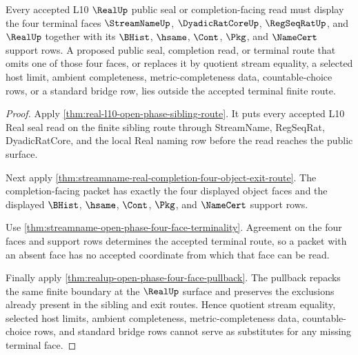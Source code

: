 \begin{theorem}
\label{thm:real-terminal-four-object-refusal}
Every accepted L10 $\RealUp$ public seal or completion-facing read must display the four terminal faces $\StreamNameUp$, $\DyadicRatCoreUp$, $\RegSeqRatUp$, and $\RealUp$ together with its $\BHist$, $\hsame$, $\Cont$, $\Pkg$, and $\NameCert$ support rows. A proposed public seal, completion read, or terminal route that omits one of those four faces, or replaces it by quotient stream equality, a selected host limit, ambient completeness, metric-completeness data, countable-choice rows, or a standard bridge row, lies outside the accepted terminal finite route.
\end{theorem}
\begin{proof}
Apply \autoref{thm:real-l10-open-phase-sibling-route}. It puts every accepted L10 Real seal read on the finite sibling route through StreamName, RegSeqRat, DyadicRatCore, and the local Real naming row before the read reaches the public surface.

Next apply \autoref{thm:streamname-real-completion-four-object-exit-route}. The completion-facing packet has exactly the four displayed object faces and the displayed $\BHist$, $\hsame$, $\Cont$, $\Pkg$, and $\NameCert$ support rows.

Use \autoref{thm:streamname-open-phase-four-face-terminality}. Agreement on the four faces and support rows determines the accepted terminal route, so a packet with an absent face has no accepted coordinate from which that face can be read.

Finally apply \autoref{thm:realup-open-phase-four-face-pullback}. The pullback repacks the same finite boundary at the $\RealUp$ surface and preserves the exclusions already present in the sibling and exit routes. Hence quotient stream equality, selected host limits, ambient completeness, metric-completeness data, countable-choice rows, and standard bridge rows cannot serve as substitutes for any missing terminal face.
\end{proof}

